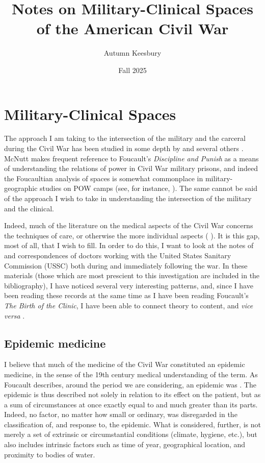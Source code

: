\documentclass{report}
\title{Notes on Military-Clinical Spaces of the American Civil War}
\author{Autumn Keesbury}
\date{Fall 2025}
\begin{document}
  \maketitle
  \thispagestyle{empty}
  \newpage
  \pagestyle{fancy}


  \chapter{Military-Clinical Spaces}\label{chap: 1} %
  
  The approach I am taking to the intersection of the military and the carceral during the Civil War has been studied in some depth by \citeauthor{McNutt2024}
  and several others \autocites{McNutt2024}{McNutt2021}{McNutt2019}{McNutt2019a}. McNutt makes frequent reference to Foucault's \textit{Discipline and Punish} as a 
  means of understanding the relations of power in Civil War military prisons, and indeed the Foucaultian analysis of spaces is somewhat commonplace in military-geographic studies on POW camps (see, for instance, \citeauthor{Moran2022}). The same cannot be said of the approach I wish to take in understanding the
  intersection of the military and the clinical.

  Indeed, much of the literature on the medical aspects of the Civil War concerns the techniques of care, or otherwise the more individual aspects 
  (\citeauthor{Devine2016} ). It is this gap, most of all, that I wish to fill. In order to do this, I want to look at the notes of and
  correspondences of doctors working with the United States Sanitary Commission (USSC) both during and immediately following the war. In these materials 
  (those which are most prescient to this investigation are included in the bibliography), I have noticed several very interesting patterns, and, since I have
  been reading these records at the same time as I have been reading Foucault's \textit{The Birth of the Clinic}, I have been able to connect theory to
  content, and \textit{vice versa} \autocite{Foucault1994}.

  \section{Epidemic medicine}\label{sec:epidemic_medicine} %
  I believe that much of the medicine of the Civil War constituted an epidemic medicine, in the sense of the 19th century medical understanding of the term.
  As Foucault describes, around the period we are considering, an epidemic was  \autocite[pp. 23]{Foucault1994}. The epidemic is thus described not solely in relation to its
  effect on the patient, but as a sum of circumstances at once exactly equal to and much greater than its parts. Indeed, no factor,
  no matter how small or ordinary, was disregarded in the classification of, and response to, the epidemic. What is considered, further, is not merely a set
  of extrinsic or circumstantial conditions (climate, hygiene, etc.), but also includes intrinsic factors such as time of year, geographical location,
  and proximity to bodies of water. 
\end{document}
